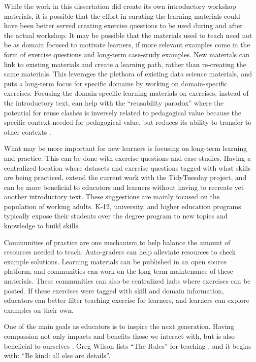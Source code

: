 \documentclass[../main.tex]{subfiles}
\begin{document}
While the work in this dissertation did create its own introductory workshop materials,
it is possible that the effort in curating the learning materials could have been better served creating exercise questions
to be used during and after the actual workshop.
It may be possible that the materials used to teach need not be as domain focused
to motivate learners, if more relevant examples come in the form of exercise questions and long-term case-study examples.
New materials can link to existing materials and create a learning path,
rather than re-creating the same materials.
This leverages the plethora of existing data science materials,
and puts a long-term focus for specific domains by working on domain-specific exercises.
Focusing the domain-specific learning materials on exercises, instead of the introductory text,
can help with the ``reusability paradox'' where the potential for reuse clashes is inversely related to pedagogical value
because the specific context needed for pedagogical value, but reduces its ability to transfer to other contexts
\cite{wileyReusabilityParadox2002}.

What may be more important for new learners is focusing on long-term learning and practice.
This can be done with exercise questions and case-studies.
Having a centralized location where datasets and exercise questions tagged with what skills are being practiced,
extend the current work with the TidyTuesday project,
and can be more beneficial to educators and learners without having to recreate yet another
introductory text.
These suggestions are mainly focused on the population of working adults.
K-12, university, and higher education programs typically expose their students
over the degree program to new topics and knowledge to build skills.

Communities of practice are one mechanism to help balance the amount of resources needed to teach.
Auto-graders can help alleviate resources to check example solutions.
Learning materials can be published in an open source platform,
and communities can work on the long-term maintenance of these materials.
These communities can also be centralized hubs where exercises can be posted.
If these exercises were tagged with skill and domain information,
educators can better filter teaching exercise for learners,
and learners can explore examples on their own.

One of the main goals as educators is to inspire the next generation.
Having compassion not only impacts and benefits those we interact with, but is also beneficial to ourselves
\cite{trzeciakCompassionomics2019}.
Greg Wilson lists ``The Rules'' for teaching \cite{wilson2019teaching}, and it begins with: ``Be kind: all else are details''.
\end{document}
